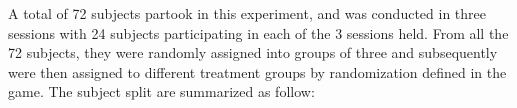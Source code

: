  A total of 72 subjects partook in this experiment, and was conducted in three sessions with 24 subjects participating in each of the 3 sessions held. From all the 72 subjects, they were randomly assigned into groups of three and subsequently were then assigned to different treatment groups by randomization defined in the game. The subject split are summarized as follow:

 


%
%

